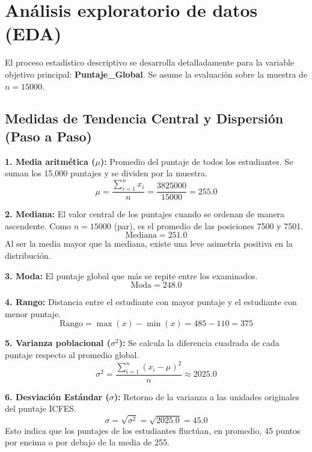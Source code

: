 \documentclass[12pt]{article}
\begin{document}
\section{Análisis exploratorio de datos (EDA)}

El proceso estadístico descriptivo se desarrolla detalladamente para la variable objetivo principal: \textbf{Puntaje\_Global}. Se asume la evaluación sobre la muestra de $n = 15000$.

\subsection{Medidas de Tendencia Central y Dispersión (Paso a Paso)}

\textbf{1. Media aritmética ($\mu$):} Promedio del puntaje de todos los estudiantes. Se suman los 15,000 puntajes y se dividen por la muestra.
\[ \mu = \frac{\sum_{i=1}^{n} x_i}{n} = \frac{3825000}{15000} = 255.0 \]

\textbf{2. Mediana:} El valor central de los puntajes cuando se ordenan de manera ascendente. Como $n=15000$ (par), es el promedio de las posiciones 7500 y 7501.
\[ \text{Mediana} = 251.0 \]
Al ser la media mayor que la mediana, existe una leve asimetría positiva en la distribución.

\textbf{3. Moda:} El puntaje global que más se repite entre los examinados.
\[ \text{Moda} = 248.0 \]

\textbf{4. Rango:} Distancia entre el estudiante con mayor puntaje y el estudiante con menor puntaje.
\[ \text{Rango} = \max(x) - \min(x) = 485 - 110 = 375 \]

\textbf{5. Varianza poblacional ($\sigma^2$):} Se calcula la diferencia cuadrada de cada puntaje respecto al promedio global.
\[ \sigma^2 = \frac{\sum_{i=1}^{n} (x_i - \mu)^2}{n} \approx 2025.0 \]

\textbf{6. Desviación Estándar ($\sigma$):} Retorno de la varianza a las unidades originales del puntaje ICFES.
\[ \sigma = \sqrt{\sigma^2} = \sqrt{2025.0} = 45.0 \]
Esto indica que los puntajes de los estudiantes fluctúan, en promedio, 45 puntos por encima o por debajo de la media de 255.
\end{document}
